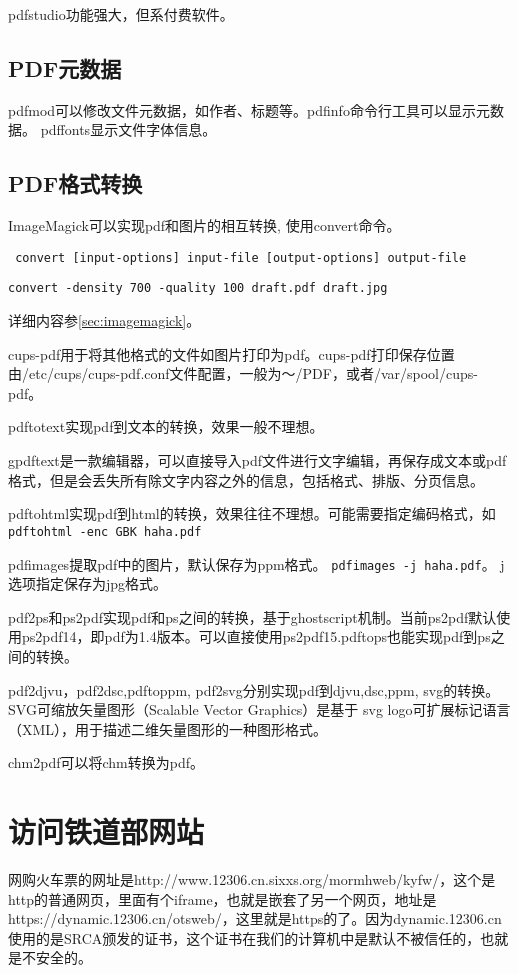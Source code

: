 pdfstudio功能强大，但系付费软件。

\subsection{PDF元数据}
pdfmod可以修改文件元数据，如作者、标题等。pdfinfo命令行工具可以显示元数据。
pdffonts显示文件字体信息。

\subsection{PDF格式转换}
ImageMagick可以实现pdf和图片的相互转换, 使用convert命令。
\begin{verbatim}
 convert [input-options] input-file [output-options] output-file
\end{verbatim}

\begin{verbatim}
convert -density 700 -quality 100 draft.pdf draft.jpg
\end{verbatim}
详细内容参\ref{sec:imagemagick}。

cups-pdf用于将其他格式的文件如图片打印为pdf。cups-pdf打印保存位置由/etc/cups/cups-pdf.conf文件配置，一般为～/PDF，或者/var/spool/cups-pdf。

pdftotext实现pdf到文本的转换，效果一般不理想。

gpdftext是一款编辑器，可以直接导入pdf文件进行文字编辑，再保存成文本或pdf格式，但是会丢失所有除文字内容之外的信息，包括格式、排版、分页信息。

pdftohtml实现pdf到html的转换，效果往往不理想。可能需要指定编码格式，如
\verb+pdftohtml -enc GBK haha.pdf +

pdfimages提取pdf中的图片，默认保存为ppm格式。
\verb+pdfimages -j haha.pdf+。
j选项指定保存为jpg格式。

pdf2ps和ps2pdf实现pdf和ps之间的转换，基于ghostscript机制。当前ps2pdf默认使用ps2pdf14，即pdf为1.4版本。可以直接使用ps2pdf15.pdftops也能实现pdf到ps之间的转换。

pdf2djvu，pdf2dsc,pdftoppm, pdf2svg分别实现pdf到djvu,dsc,ppm, svg的转换。SVG可缩放矢量图形（Scalable Vector Graphics）是基于  svg logo可扩展标记语言（XML），用于描述二维矢量图形的一种图形格式。

chm2pdf可以将chm转换为pdf。



\section{访问铁道部网站}
网购火车票的网址是http://www.12306.cn.sixxs.org/mormhweb/kyfw/，这个是http的普通网页，里面有个iframe，也就是嵌套了另一个网页，地址是https://dynamic.12306.cn/otsweb/，这里就是https的了。因为dynamic.12306.cn使用的是SRCA颁发的证书，这个证书在我们的计算机中是默认不被信任的，也就是不安全的。


